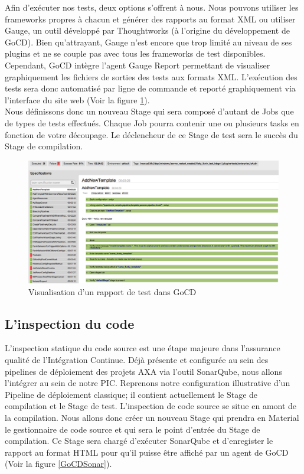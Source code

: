      Afin d'exécuter nos tests, deux options s'offrent à nous. Nous pouvons utiliser les frameworks propres à chacun et générer des rapports au format XML ou utiliser Gauge, un outil développé par Thoughtworks (à l'origine du développement de GoCD). Bien qu'attrayant, Gauge n'est encore que trop limité au niveau de ses plugins et ne se couple pas avec tous les frameworks de test disponibles. Cependant, GoCD intègre l'agent Gauge Report permettant de visualiser graphiquement les fichiers de sorties des tests aux formats XML. L'exécution des tests sera donc automatisé par ligne de commande et reporté graphiquement via l'interface du site web (Voir la figure \ref{GoCDReportTest}).\\

      Nous définissons donc un nouveau Stage qui sera composé d'autant de Jobs que de types de tests effectués. Chaque Job pourra contenir une ou plusieurs tasks en fonction de votre découpage. Le déclencheur de ce Stage de test sera le succès du Stage de compilation.

      \begin{figure}
        \begin{center}
          \includegraphics[scale=0.15]{images/GoCDReportTest.png}
        \end{center}
        \caption{Visualisation d'un rapport de test dans GoCD}
        \label{GoCDReportTest}
      \end{figure}

      \subsection{L'inspection du code}
      L'inspection statique du code source est une étape majeure dans l'assurance qualité de l'Intégration Continue. Déjà présente et configurée au sein des pipelines de déploiement des projets AXA via l'outil SonarQube, nous allons l'intégrer au sein de notre PIC. Reprenons notre configuration illustrative d'un Pipeline de déploiement classique; il contient actuellement le Stage de compilation et le Stage de test. L'inspection de code source se situe en amont de la compilation. Nous allons donc créer un nouveau Stage qui prendra en Material le gestionnaire de code source et qui sera le point d'entrée du Stage de compilation. Ce Stage sera chargé d'exécuter SonarQube et d'enregister le rapport au format HTML pour qu'il puisse être affiché par un agent de GoCD (Voir la figure \ref{GoCDSonar}).\\

